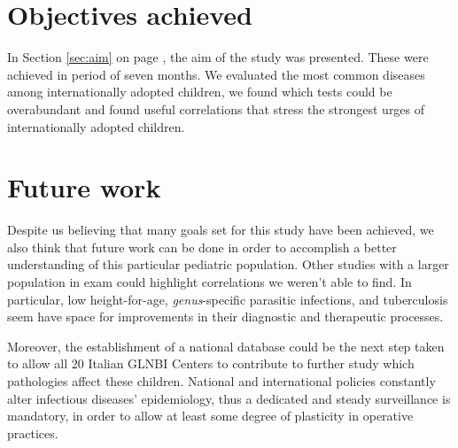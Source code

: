 \section{Objectives achieved}\label{secd:objectivesachieved}
In Section \ref{sec:aim} on page \pageref{sec:aim}, the aim of the study was presented. These were achieved in period of seven months. We evaluated the most common diseases among internationally adopted children, we found which tests could be overabundant and found useful correlations that stress the strongest urges of internationally adopted children.

\section{Future work}\label{sec:futurework}
Despite us believing that many goals set for this study have been achieved, we also think that future work can be done in order to accomplish a better understanding of this particular pediatric population. Other studies with a larger population in exam could highlight correlations we weren't able to find. In particular, low height-for-age, \textit{genus}-specific parasitic infections, and tuberculosis seem have space for improvements in their diagnostic and therapeutic processes.

Moreover, the establishment of a national database could be the next step taken to allow all 20 Italian GLNBI Centers to contribute to further study which pathologies affect these children. National and international policies constantly alter infectious diseases' epidemiology, thus a dedicated and steady surveillance is mandatory, in order to allow at least some degree of plasticity in operative practices.  